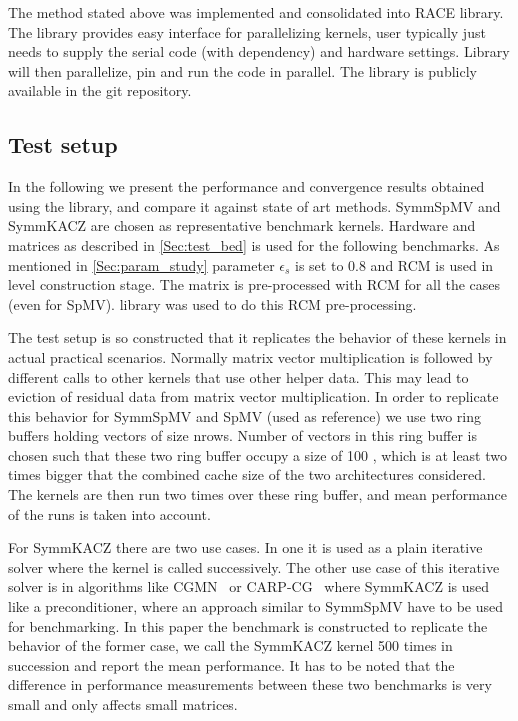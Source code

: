 The method stated above was implemented and consolidated into \acrshort{RACE} library. The library provides easy interface for parallelizing kernels, user typically just needs to supply the serial code (with dependency) and hardware settings. Library will then parallelize, pin and run the code in parallel. The library is publicly available in the git repository. %

\subsection{Test setup}
In the following we present the performance and convergence results obtained using the library, and compare it against state of art methods. \acrshort{SymmSpMV} and \acrshort{SymmKACZ} are chosen as representative benchmark kernels. Hardware and matrices as described in \cref{Sec:test_bed} is used for the following benchmarks. As mentioned in \cref{Sec:param_study} parameter $\epsilon_s$ is set to 0.8 and \acrshort{RCM} is used in level construction stage. The matrix is pre-processed with \acrshort{RCM} for all the cases (even for \acrshort{SpMV}). \SPMP \cite{SpMP} library was used to do this \acrshort{RCM} pre-processing.

The test setup is so constructed that it replicates the behavior of these kernels in actual practical scenarios. Normally matrix vector multiplication is followed by different calls to other kernels that use other helper data. This may lead to eviction of residual data from matrix vector multiplication. In order to replicate this behavior for \acrshort{SymmSpMV} and \acrshort{SpMV} (used as reference) we use  two ring buffers holding vectors of size \acrshort{nrows}. Number of vectors in this ring buffer is chosen such that these two ring buffer occupy a size of 100 \MB, which is at least two times bigger that the combined cache size of the two architectures considered. The kernels are then run two times over these ring buffer, and mean performance of the runs is taken into account.

For \acrshort{SymmKACZ} there are two use cases. In one it is used as a plain iterative solver where the kernel is called successively. The other use case of this iterative solver is in algorithms like CGMN~\cite{CGMN, CGMN_gordon} or CARP-CG~\cite{CARP-CG} where \acrshort{SymmKACZ} is used like a preconditioner, where an approach similar to \acrshort{SymmSpMV} have to be used for benchmarking. In this paper the benchmark is constructed to replicate the behavior of the former case, \ie we call the \acrshort{SymmKACZ} kernel 500 times in succession and report the mean performance. It has to be noted that the difference in performance measurements between these two benchmarks is very small and only affects small matrices.


